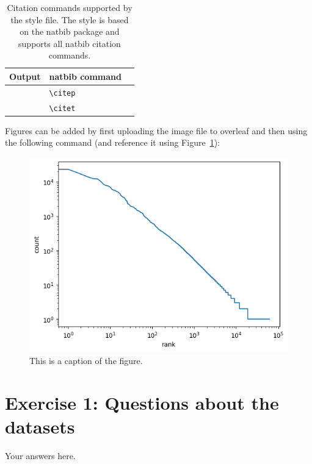 \documentclass[11pt]{article}
\begin{document}
\begin{table}
  \centering
  \begin{tabular}{lll}
    \hline
    \textbf{Output}           & \textbf{natbib command} \\
    \hline
    \citep{Gusfield:97}       & \verb|\citep|           \\
    \citet{Gusfield:97}       & \verb|\citet|           \\
    \hline
  \end{tabular}
  \caption{\label{citation-guide}
    Citation commands supported by the style file.
    The style is based on the natbib package and supports all natbib citation commands.
  }
  \label{tab:citations}
\end{table}

Figures can be added by first uploading the image file to overleaf and then using the following command (and reference it using Figure~\ref{fig:zipf}):
\begin{figure}[t]
  \includegraphics[width=\columnwidth]{zipf.png}
  \caption{This is a caption of the figure.}
  \label{fig:zipf}
\end{figure}

\section{Exercise 1: Questions about the datasets}

Your answers here.

\end{document}
